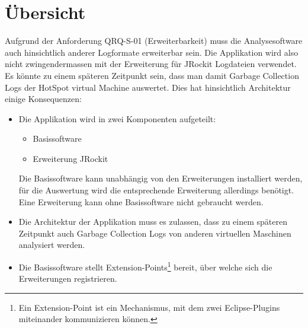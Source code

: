 \section{Übersicht}\label{konzept_uebersicht}
Aufgrund der Anforderung QRQ-S-01 (Erweiterbarkeit) muss die Analysesoftware auch hinsichtlich anderer Logformate erweiterbar sein. Die Applikation wird also nicht zwingendermassen mit der Erweiterung für JRockit Logdateien verwendet. Es könnte zu einem späteren Zeitpunkt sein, dass man damit Garbage Collection Logs der HotSpot virtual Machine auswertet. Dies hat hinsichtlich Architektur einige Konsequenzen:
\begin{itemize}
	\item Die Applikation wird in zwei Komponenten aufgeteilt:
		\begin{itemize}
			\item Basissoftware
			\item Erweiterung JRockit
		\end{itemize}
		Die Basissoftware kann unabhängig von den Erweiterungen installiert werden, für die Auswertung wird die entsprechende Erweiterung allerdings benötigt. Eine Erweiterung kann ohne Basissoftware nicht gebraucht werden.
	\item Die Architektur der Applikation muss es zulassen, dass zu einem späteren Zeitpunkt auch Garbage Collection Logs von anderen virtuellen Maschinen analysiert werden.
	\item Die Basissoftware stellt Extension-Points\footnote{Ein Extension-Point ist ein Mechanismus, mit dem zwei Eclipse-Plugins miteinander kommunizieren können.} bereit, über welche sich die Erweiterungen  registrieren.
\end{itemize}

